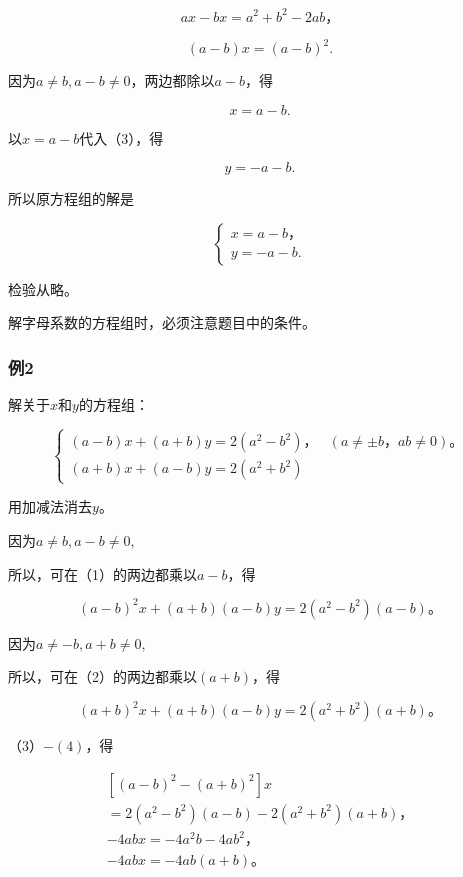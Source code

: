 \[
a x - b x = a ^ {2} + b ^ {2} - 2 a b\text{，}
\]

\[
(a - b) x = (a - b) ^ {2}.
\]

因为\(a \neq b, a - b \neq 0\)，两边都除以\(a - b\)，得

\[
x = a - b.
\]

以\(x = a - b\)代入（3），得

\[
y = - a - b.
\]

所以原方程组的解是

\[
\left\{ \begin{array}{l} x = a - b\text{，} \\ y = - a - b. \end{array} \right.
\]

检验从略。

 解字母系数的方程组时，必须注意题目中的条件。

\subsubsection{例2}

解关于\(x\)和\(y\)的方程组：

\[
\left\{ \begin{array}{ll} (a - b) x + (a + b) y = 2 (a ^ {2} - b ^ {2})\text{，} & (a \neq \pm b\text{，} a b \neq 0)\text{。} \\ (a + b) x + (a - b) y = 2 (a ^ {2} + b ^ {2}) \end{array} \right. \tag{1}
\]

 用加减法消去\(y\)。

因为\(a \neq b, a - b \neq 0,\)

所以，可在（1）的两边都乘以\(a - b\)，得

\[
(a - b) ^ {2} x + (a + b) (a - b) y = 2 (a ^ {2} - b ^ {2}) (a - b)\text{。} \tag{3}
\]

因为\(a \neq -b, a + b \neq 0,\)

所以，可在（2）的两边都乘以\((a + b)\)，得

\[
(a + b) ^ {2} x + (a + b) (a - b) y = 2 (a ^ {2} + b ^ {2}) (a + b)\text{。} \tag{4}
\]

（3）\(-(4)\)，得

\[
\begin{array}{l} [ (a - b) ^ {2} - (a + b) ^ {2} ] x \\ = 2 (a ^ {2} - b ^ {2}) (a - b) - 2 (a ^ {2} + b ^ {2}) (a + b)\text{，} \\ - 4 a b x = - 4 a ^ {2} b - 4 a b ^ {2}\text{，} \\ - 4 a b x = - 4 a b (a + b)\text{。} \tag{5} \\ \end{array}
\]

